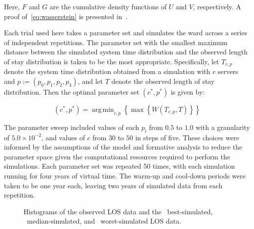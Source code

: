 \documentclass[]{interact}
\theoremstyle{plain}%
\theoremstyle{definition}
\theoremstyle{remark}
\DeclareMathOperator*{\argmin}{arg\,min}
\begin{document}
Here, \(F\) and \(G\) are the cumulative density functions of \(U\) and \(V\),
respectively. A proof of~\eqref{eq:wasserstein} is presented
in~\cite{Ramdas2017}.

Each trial used here takes a parameter set and simulates the ward across a
series of independent repetitions. The parameter set with the smallest maximum
distance between the simulated system time distribution and the observed length
of stay distribution is taken to be the most appropriate. Specifically, let
\(T_{c,p}\) denote the system time distribution obtained from a simulation with
\(c\) servers and \(p := \left(p_0,p_1,p_2,p_3\right)\), and let \(T\) denote
the observed length of stay distribution. Then the optimal parameter set
\(\left(c^*, p^*\right)\) is given by:

\begin{equation}\label{eq:parameters}
    \left(c^*, p^*\right) = \argmin_{c, p} \left\{%
        \max \left\{ W\left(T_{c,p}, T\right) \right\}%
    \right\}
\end{equation}

The parameter sweep included values of each \(p_l\) from \(0.5\) to \(1.0\) with
a granularity of \(5.0 \times 10^{-2}\), and values of \(c\) from \(30\) to
\(50\) in steps of five. These choices were informed by the assumptions of the
model and formative analysis to reduce the parameter space given the
computational resources required to perform the simulations. Each parameter set
was repeated 50 times, with each simulation running for four years of virtual
time. The warm-up and cool-down periods were taken to be one year each, leaving
two years of simulated data from each repetition.

\begin{figure}
    \centering


    \caption{%
        Histograms of the observed LOS data and the
        ~best-simulated,
        ~median-simulated, and
        ~worst-simulated LOS data.
    }\label{fig:params}
\end{figure}
\end{document}
